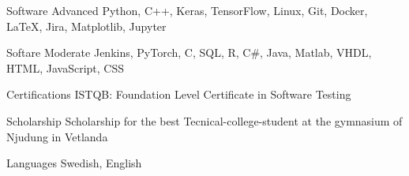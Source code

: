 

\begin{cvskills}

  \cvskill
    {Software Advanced} %
    {Python, C++, Keras, TensorFlow, Linux, Git, Docker, LaTeX, Jira, Matplotlib, Jupyter} %

  \cvskill
    {Softare Moderate} %
    {Jenkins, PyTorch, C, SQL, R, C\#, Java, Matlab, VHDL, HTML, JavaScript, CSS} %

  \cvskill
  {Certifications} %
  {ISTQB: Foundation Level Certificate in Software Testing} %

  \cvskill
    {Scholarship} %
    {Scholarship for the best Tecnical-college-student at the
    gymnasium of Njudung in Vetlanda} %

  \cvskill
    {Languages} %
    {Swedish, English} %

\end{cvskills}
